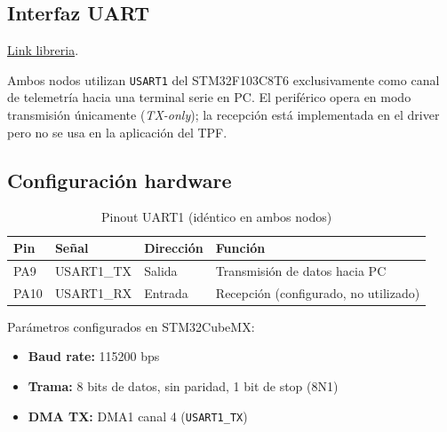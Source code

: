\documentclass[12pt,a4paper]{article}
\begin{document}
\subsection{Interfaz UART}    

\href{https://github.com/matutecno/PdM_workspace_Matias_Morales/blob/36632c7629ba2d8375b50d48365e32dbffeaf255/TPF/Personal_libs/UART_MX/Src/uart_mx.c}{Link libreria}.                                      
                                                                                
  Ambos nodos utilizan \texttt{USART1} del STM32F103C8T6 exclusivamente como    
  canal de telemetría hacia una terminal serie en PC. El periférico opera en
  modo transmisión únicamente (\textit{TX-only}); la recepción está implementada
   en el driver pero no se usa en la aplicación del TPF.

  \subsection{Configuración hardware}

  \begin{table}[h]                                                              
  \centering
  \begin{tabular}{llll}                                                         
  \hline
  \textbf{Pin} & \textbf{Señal} & \textbf{Dirección} & \textbf{Función} \\
  \hline
  PA9  & USART1\_TX & Salida  & Transmisión de datos hacia PC \\
  PA10 & USART1\_RX & Entrada & Recepción (configurado, no utilizado) \\        
  \hline                                                                        
  \end{tabular}                                                                 
  \caption{Pinout UART1 (idéntico en ambos nodos)}                              
  \end{table}                                                                   
  
  Parámetros configurados en STM32CubeMX:                                       

  \begin{itemize}                                                               
      \item \textbf{Baud rate:} 115200 bps
      \item \textbf{Trama:} 8 bits de datos, sin paridad, 1 bit de stop (8N1)   
      \item \textbf{DMA TX:} DMA1 canal 4 (\texttt{USART1\_TX})                 
  \end{itemize}
  
\end{document}
